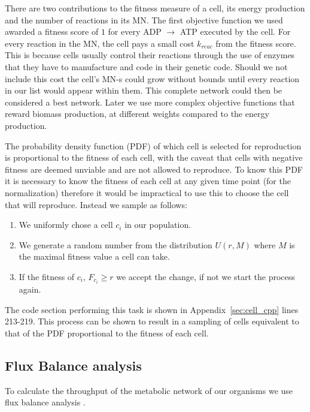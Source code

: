 \documentclass[a4paper,12pt]{article}
\begin{document}
There are two contributions to the fitness measure of a cell, its energy production and the number of reactions in its MN. The first objective function we used awarded a fitness score of $1$ for every ADP $\rightarrow$ ATP executed by the cell. For every reaction in the MN, the cell pays a small cost $k_{reac}$ from the fitness score. This is because cells usually control their reactions through the use of enzymes that they have to manufacture and code in their genetic code. Should we not include this cost the cell's MN-s could grow without bounds until every reaction in our list would appear within them. This complete network could then be considered a best network. Later we use more complex objective functions that reward biomass production, at different weights compared to the energy production. 

The probability density function (PDF) of which cell is selected for reproduction is proportional to the fitness of each cell, with the caveat that cells with negative fitness are deemed unviable and are not allowed to reproduce. To know this PDF it is necessary to know the fitness of each cell at any given time point (for the normalization) therefore it would be impractical to use this to choose the cell that will reproduce. Instead we sample as follows: 
\begin{enumerate}
	\item We uniformly chose a cell $c_i$ in our population.
	\item We generate a random number from the distribution $U \left( r,M \right)$ where $M$ is the maximal fitness value a cell can take.
	\item If the fitness of $c_i$, $F_{c_i} \geq r$ we accept the change, if not we start the process again.
\end{enumerate}

The code section performing this task is shown in Appendix~\ref{sec:cell_cpp} lines 213-219. This process can be shown to result in a sampling of cells equivalent to that of the PDF proportional to the fitness of each cell.


\subsection{Flux Balance analysis}
\label{sub:Flux Balance analysis}


	To calculate the throughput of the metabolic network of our organisms we use flux balance analysis \cite{whatisfluxbalance}. 	
\end{document}

